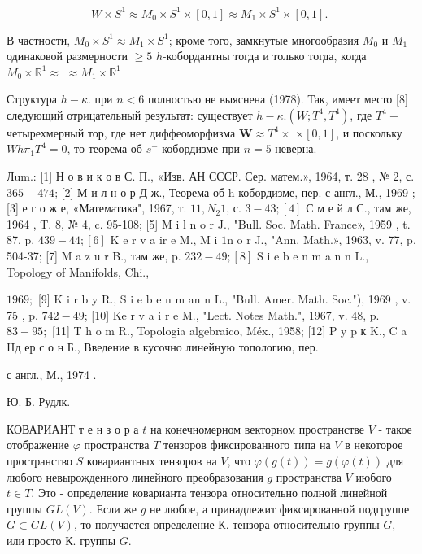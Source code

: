 \documentclass[10pt]{article}
\begin{document}
\[

W \times S^{1} \approx M_{0} \times S^{1} \times[0,1] \approx M_{1} \times S^{1} \times[0,1] \text {. }

\]



В частности, $M_{0} \times S^{1} \approx M_{1} \times S^{1}$; кроме того, замкнутые многообразия $M_{0}$ и $M_{1}$ одинаковой размерности $\geqslant 5$ $h$-кобордантны тогда и только тогда, когда $M_{0} \times \mathbb{R}^{1} \approx$ $\approx M_{1} \times \mathbb{R}^{1}$



Структура $h-\kappa$. при $n<6$ полностью не выяснена (1978). Так, имеет место [8] следующий отрицательный результат: существует $h-\kappa .\left(W ; T^{4}, T^{4}\right)$, где $T^{4}-$ четырехмерный тор, где нет диффеоморфизма $\boldsymbol{W} \approx T^{4} \times$ $\times[0,1]$, и поскольку $W h \pi_{1} T^{4}=0$, то теорема об $s^{-}$ кобордизме при $n=5$ неверна.



Лum.: [1] Н о в и к о в С. П., «Изв. АН СССР. Сер. матем.», 1964, т. 28 , № 2, с. $365-474$; [2] М и л н о р Д ж., Теорема об h-кобордизме, пер. с англ., М., 1969 ; [3] е г о ж е, «Математика", 1967, т. $11, N_{2} 1$, с. $3-43 ;[4]$ С м е й л С., там же, 1964 , T. 8, № 4, c. 95-108; [5] M i l n o r J., "Bull. Soc. Math. France», 1959 , t. 87, p. $439-44 ;[6]$ K e r v a ir e M., M i $1 \mathrm{n}$ o r J., "Ann. Math.», 1963, v. 77, p. 504-37; [7] M a z u r B., там же, p. $232-49 ;[8]$ S i e b e n m a n n L., Topology of Manifolds, Chi.,

$1969 ;$ [9] K i r b y R., S i e b e n m an n L., "Bull. Amer. Math. Soc."), 1969 , v. 75 , p. $742-49$; [10] Ke r v a i r e M., "Lect. Notes Math.", 1967, v. 48, p. $83-95 ;$ [11] T h o m R., Topologia algebraico, Méx., 1958; [12] P y p к K., C a Hд ер с о н Б., Введение в кусочно линейную топологию, пер.

с англ., М., 1974 .

Ю. Б. Рудлк.



КОВАРИАНТ т е н з о р а $t$ на конечномерном векторном пространстве $V$ - такое отображение $\varphi$ пространства $T$ тензоров фиксированного типа на $V$ в некоторое пространство $S$ ковариантных тензоров на $V$, что $\varphi(g(t))=g(\varphi(t))$ для любого невырожденного линейного преобразования $g$ пространства $V$ июбого $t \in T$. Это - определение коварианта тензора относительно полной линейной группы $G L(V)$. Если же $g$ не любое, а принадлежит фиксированной подгруппе $G \subset G L(V)$, то получается определение К. тензора относительно группы $G$, или просто К. группы $G$.
\end{document}
